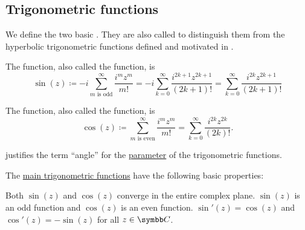 \subsection{Trigonometric functions}\label{subsec:trigonometric_functions}

\begin{definition}\label{def:trigonometric_functions}
  We define the two basic . They are also called  to distinguish them from the hyperbolic trigonometric functions defined and motivated in .

  \begin{DefEnum}
     The  function, also called the  function, is
    \begin{equation*}
      \sin(z)
      \coloneqq
      -i \sum_{m \text{ is odd}}^\infty \frac {i^m z^m} {m!}
      =
      -i \sum_{k=0}^\infty \frac {i^{2k+1} z^{2k+1}} {(2k + 1)!}
      =
      \sum_{k=0}^\infty \frac {i^{2k} z^{2k+1}} {(2k + 1)!}
    \end{equation*}

     The  function, also called the  function, is
    \begin{equation*}
      \cos(z)
      \coloneqq
      \sum_{m \text{ is even}}^\infty \frac {i^m z^m} {m!}
      =
      \sum_{k=0}^\infty \frac {i^{2k} z^{2k}} {(2k)!}.
    \end{equation*}
  \end{DefEnum}

   justifies the term \enquote{angle} for the \hyperref[def:function/argument]{parameter} of the trigonometric functions.
\end{definition}
\begin{proposition}\label{thm:trigonometric_function_properties}
  The \hyperref[def:trigonometric_functions]{main trigonometric functions} have the following basic properties:
  \begin{PropEnum}
     Both \( \sin(z) \) and \( \cos(z) \) converge in the entire complex plane.
     \( \sin(z) \) is an odd function and \( \cos(z) \) is an even function.
     \( \sin'(z) = \cos(z) \) and \( \cos'(z) = -\sin(z) \) for all \( z \in \BC \).
  \end{PropEnum}
\end{proposition}
